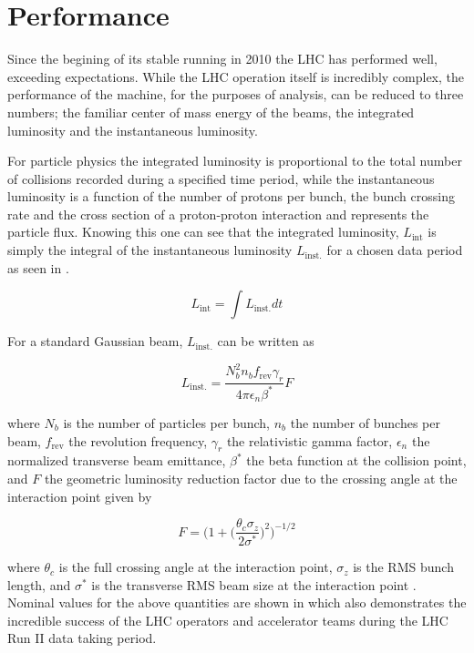 \section{Performance} \label{sec:lhc:performance}

Since the begining of its stable running in 2010 the LHC has performed well,
exceeding expectations.  While the LHC operation itself is incredibly complex,
the performance of the machine, for the purposes of analysis, can be reduced to
three numbers; the familiar center of mass energy of the beams, the integrated
luminosity and the instantaneous luminosity.  

For particle physics the integrated luminosity is proportional to the total
number of collisions recorded during a specified time period, while the
instantaneous luminosity is a function of the number of protons per bunch, the
bunch crossing rate and the cross section of a proton-proton interaction and
represents the particle flux.  Knowing this one can see that the integrated
luminosity, $L_{\text{int}}$ is simply the integral of the instantaneous luminosity
$L_{\text{inst.}}$ for a chosen data period as seen in
.

\begin{equation} \label{eq:integrated_luminosity}
   L_{\text{int}} = \int L_{\text{inst.}}dt 
\end{equation}

For a standard Gaussian beam, $L_{\text{inst.}}$ can be written as

\begin{equation} \label{eq:inst_luminosity}
  L_{\text{inst.}} = \frac{N_{b}^{2}n_{b}f_{\text{rev}}\gamma_{r}}{4\pi\epsilon_{n}\beta^{*}}F
\end{equation}

where $N_{b}$ is the number of particles per bunch, $n_{b}$ the number of
bunches per beam, $f_{\text{rev}}$ the revolution frequency, $\gamma_{r}$ the
relativistic gamma factor, $\epsilon_{n}$ the normalized transverse beam
emittance, $\beta^{*}$ the beta function at the collision point, and $F$ the
geometric luminosity reduction factor due to the crossing angle at the
interaction point given by

\begin{equation}
  F = \bigg(1 + \Big( \frac{\theta_{c}\sigma_{z}}{2\sigma^{*}} \Big) ^{2}
\bigg)^{-1/2} 
\end{equation}

where $\theta_{c}$ is the full crossing angle at the interaction point,
$\sigma_{z}$ is the RMS bunch length, and $\sigma^{*}$ is the transverse RMS
beam size at the interaction point \cite{Evans:2008zzb}. Nominal values for the
above quantities are shown in  which also
demonstrates the incredible success of the LHC operators and accelerator teams
during the LHC Run II data taking period.


